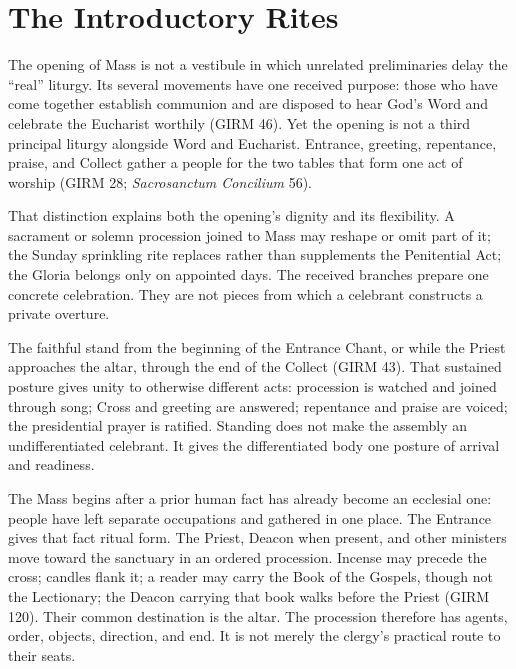 \section{The Introductory Rites}

The opening of Mass is not a vestibule in which unrelated preliminaries delay the ``real'' liturgy. Its several movements have one received purpose: those who have come together establish communion and are disposed to hear God's Word and celebrate the Eucharist worthily (GIRM 46). Yet the opening is not a third principal liturgy alongside Word and Eucharist. Entrance, greeting, repentance, praise, and Collect gather a people for the two tables that form one act of worship (GIRM 28; \emph{Sacrosanctum Concilium} 56).

That distinction explains both the opening's dignity and its flexibility. A sacrament or solemn procession joined to Mass may reshape or omit part of it; the Sunday sprinkling rite replaces rather than supplements the Penitential Act; the Gloria belongs only on appointed days. The received branches prepare one concrete celebration. They are not pieces from which a celebrant constructs a private overture.

The faithful stand from the beginning of the Entrance Chant, or while the Priest approaches the altar, through the end of the Collect (GIRM 43). That sustained posture gives unity to otherwise different acts: procession is watched and joined through song; Cross and greeting are answered; repentance and praise are voiced; the presidential prayer is ratified. Standing does not make the assembly an undifferentiated celebrant. It gives the differentiated body one posture of arrival and readiness.


The Mass begins after a prior human fact has already become an ecclesial one: people have left separate occupations and gathered in one place. The Entrance gives that fact ritual form. The Priest, Deacon when present, and other ministers move toward the sanctuary in an ordered procession. Incense may precede the cross; candles flank it; a reader may carry the Book of the Gospels, though not the Lectionary; the Deacon carrying that book walks before the Priest (GIRM 120). Their common destination is the altar. The procession therefore has agents, order, objects, direction, and end. It is not merely the clergy's practical route to their seats.

